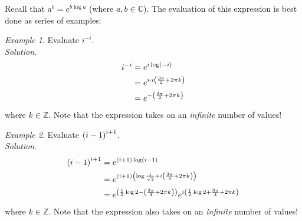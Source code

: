 \documentclass[10pt]{scrartcl}
\numberwithin{equation}{subsection}
\theoremstyle{definition}
\theoremstyle{remark}
\newtheorem*{example}{Example}
\newcommand{\Complex}{\mathbb{C}}
\newcommand{\Integers}{\mathbb{Z}}
\begin{document}
Recall that $a^b = e^{b \log a}$ (where $a,b\in\Complex$). The evaluation of 
this expression is best done as series of examples:
\begin{example}
	Evaluate $i^{-i}$.\\
	\textit{Solution}.
	\begin{align*}
		i^{-i} &= e^{i\log(-i)}\\
				&= e^{i \cdot i\qty(\frac{3\pi}{2} + 2\pi k)}\\
				&= e^{-\pqty{\frac{3\pi}{2} + 2\pi k}}
	\end{align*}
	where $k\in\Integers$. Note that the expression takes on an
	\emph{infinite} number of values!
\end{example}
\begin{example}
	Evaluate $ \pqty{i-1}^{i+1}$.\\
	\textit{Solution}.
	\begin{align*}
		\pqty{i-1}^{i+1} &= e^{(i+1)\log(i-1)}\\
		  &= e^{(i+1)\qty(\log{\frac{1}{\sqrt{2}}} + i\qty(\frac{3\pi}{4} + 2\pi k))}\\
		  &= e^{\pqty{\frac{1}{2}\log{2} -\qty(\frac{3\pi}{4} + 2\pi k)}}
		e^{i\pqty{\frac{1}{2}\log{2} + \frac{3\pi}{4} + 2\pi k}}
	\end{align*}
	where $k \in \Integers$. Note that the expression also takes on an
	\emph{infinite} number of values!
\end{example}
\end{document}
